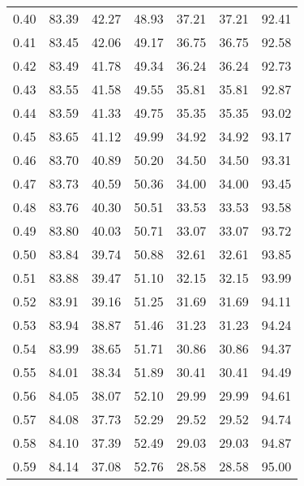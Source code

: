 \begin{tabular}{|c|c|c|c|c|c|c|}
      0.40 &     83.39 &     42.27 &      48.93 &   37.21 &      37.21 &         92.41 \\
      0.41 &     83.45 &     42.06 &      49.17 &   36.75 &      36.75 &         92.58 \\
      0.42 &     83.49 &     41.78 &      49.34 &   36.24 &      36.24 &         92.73 \\
      0.43 &     83.55 &     41.58 &      49.55 &   35.81 &      35.81 &         92.87 \\
      0.44 &     83.59 &     41.33 &      49.75 &   35.35 &      35.35 &         93.02 \\
      0.45 &     83.65 &     41.12 &      49.99 &   34.92 &      34.92 &         93.17 \\
      0.46 &     83.70 &     40.89 &      50.20 &   34.50 &      34.50 &         93.31 \\
      0.47 &     83.73 &     40.59 &      50.36 &   34.00 &      34.00 &         93.45 \\
      0.48 &     83.76 &     40.30 &      50.51 &   33.53 &      33.53 &         93.58 \\
      0.49 &     83.80 &     40.03 &      50.71 &   33.07 &      33.07 &         93.72 \\
      0.50 &     83.84 &     39.74 &      50.88 &   32.61 &      32.61 &         93.85 \\
      0.51 &     83.88 &     39.47 &      51.10 &   32.15 &      32.15 &         93.99 \\
      0.52 &     83.91 &     39.16 &      51.25 &   31.69 &      31.69 &         94.11 \\
      0.53 &     83.94 &     38.87 &      51.46 &   31.23 &      31.23 &         94.24 \\
      0.54 &     83.99 &     38.65 &      51.71 &   30.86 &      30.86 &         94.37 \\
      0.55 &     84.01 &     38.34 &      51.89 &   30.41 &      30.41 &         94.49 \\
      0.56 &     84.05 &     38.07 &      52.10 &   29.99 &      29.99 &         94.61 \\
      0.57 &     84.08 &     37.73 &      52.29 &   29.52 &      29.52 &         94.74 \\
      0.58 &     84.10 &     37.39 &      52.49 &   29.03 &      29.03 &         94.87 \\
      0.59 &     84.14 &     37.08 &      52.76 &   28.58 &      28.58 &         95.00 \\

\end{tabular}

